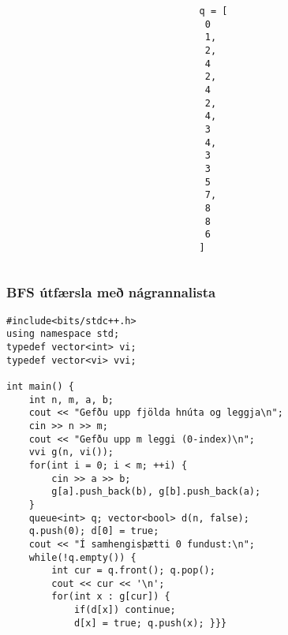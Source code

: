 \documentclass{beamer}
\begin{document}
\begin{frame}[fragile]
\begin{columns}
\begin{column}{0.75\textwidth}
\end{column}

\begin{column}{0.25\textwidth}
\texttt{q = [} \\
 {
\texttt{    0\\}
}
 {
\texttt{    1,\\}
\texttt{    2,\\}
\texttt{    4\\}
}
 {
\texttt{    2,\\}
\texttt{    4\\}
}
 {
\texttt{    2,\\}
\texttt{    4,\\}
\texttt{    3\\}
}
 {
\texttt{    4,\\}
\texttt{    3\\}
}
 {
\texttt{    3\\}
}
 {
\texttt{    5\\}
}
 {
\texttt{    7,\\}
\texttt{    8\\}
}
 {
\texttt{    8\\}
}
 {
\texttt{    6\\}
}
\texttt{]}
\end{column}
\end{columns}

\end{frame}

\begin{frame}[fragile]
\frametitle{BFS útfærsla með nágrannalista}

\begin{scriptsize}
\begin{verbatim}
#include<bits/stdc++.h>
using namespace std;
typedef vector<int> vi;
typedef vector<vi> vvi;

int main() {
    int n, m, a, b;
    cout << "Gefðu upp fjölda hnúta og leggja\n";
    cin >> n >> m;
    cout << "Gefðu upp m leggi (0-index)\n";
    vvi g(n, vi());
    for(int i = 0; i < m; ++i) {
        cin >> a >> b;
        g[a].push_back(b), g[b].push_back(a);
    }
    queue<int> q; vector<bool> d(n, false);
    q.push(0); d[0] = true;
    cout << "Í samhengisþætti 0 fundust:\n";
    while(!q.empty()) {
        int cur = q.front(); q.pop();
        cout << cur << '\n'; 
        for(int x : g[cur]) {
            if(d[x]) continue;
            d[x] = true; q.push(x); }}}
\end{verbatim}
\end{scriptsize}

\end{frame}
\end{document}
